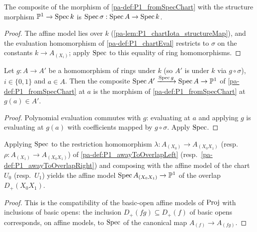 \begin{lemma}
  \label{pa-lem:P1_fromSpecChart_over}
  \leanok

  The composite of the morphism of \ref{pa-def:P1_fromSpecChart} with the structure morphism
  \(\mathbb{P}^1 \to \operatorname{Spec} k\) is \(\operatorname{Spec} \sigma : \operatorname{Spec} A \to \operatorname{Spec} k\).
\end{lemma}
\begin{proof}
  \leanok
  The affine model lies over \(k\) (\ref{pa-lem:P1_chartIota_structureMap}), and the
  evaluation homomorphism of \ref{pa-def:P1_chartEval} restricts to \(\sigma\) on the constants
  \(k \to A_{(X_i)}\); apply \(\operatorname{Spec}\) to this equality of ring homomorphisms.
\end{proof}

\begin{lemma}
  \label{pa-lem:P1_fromSpecChart_natural}
  \leanok

  Let \(g : A \to A'\) be a homomorphism of rings under \(k\) (so \(A'\) is under \(k\)
  via \(g \circ \sigma\)), \(i \in \{0,1\}\) and \(a \in A\). Then the composite
  \(\operatorname{Spec} A' \xrightarrow{\operatorname{Spec} g} \operatorname{Spec} A \to \mathbb{P}^1\) of \ref{pa-def:P1_fromSpecChart} at
  \(a\) is the morphism of \ref{pa-def:P1_fromSpecChart} at \(g(a) \in A'\).
\end{lemma}
\begin{proof}
  \leanok
  Polynomial evaluation commutes with \(g\): evaluating at \(a\) and applying \(g\) is
  evaluating at \(g(a)\) with coefficients mapped by \(g \circ \sigma\). Apply \(\operatorname{Spec}\).
\end{proof}

\begin{lemma}
  \label{pa-lem:P1_SpecMap_overlap_chartIota}
  \leanok

  Applying \(\operatorname{Spec}\) to the restriction homomorphism \(\lambda : A_{(X_0)} \to
  A_{(X_0X_1)}\) (resp.\ \(\rho : A_{(X_1)} \to A_{(X_0X_1)}\)) of
  \ref{pa-def:P1_awayToOverlapLeft} (resp.\ \ref{pa-def:P1_awayToOverlapRight}) and composing
  with the affine model of the chart \(U_0\) (resp.\ \(U_1\)) yields the affine model
  \(\operatorname{Spec} A_{(X_0X_1)} \to \mathbb{P}^1\) of the overlap \(D_+(X_0X_1)\).
\end{lemma}
\begin{proof}
  \leanok
  This is the compatibility of the basic-open affine models of \(\operatorname{Proj}\) with inclusions
  of basic opens: the inclusion \(D_+(fg) \subseteq D_+(f)\) of basic opens corresponds,
  on affine models, to \(\operatorname{Spec}\) of the canonical map \(A_{(f)} \to A_{(fg)}\).
\end{proof}

